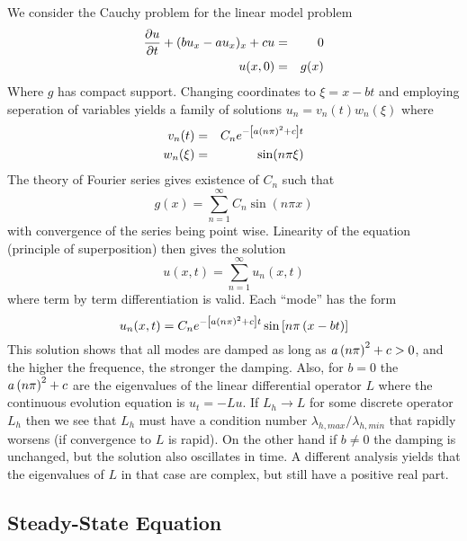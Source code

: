 \documentclass[10pt,dvips,twoside,reqno]{amsart}
\begin{document}
We consider the Cauchy problem for the linear model problem
\begin{eqnarray}
\frac{\partial {u}}{\partial {t}} +(b u_x - a u_x)_x + c u &=& 0 \\
u(x,0) &=& g(x)
\end{eqnarray}
Where $g$ has compact support. Changing coordinates to $\xi = x - bt$
and employing seperation of variables yields a family of solutions
$u_n = v_n(t) w_n(\xi)$ where
\begin{eqnarray}
v_n(t) &=& C_n e^{-\left[ a\left( n \pi \right)^2 + c \right] t} \\
w_n(\xi) &=& \sin(n \pi \xi)
\end{eqnarray}
The theory of Fourier series gives existence of $C_n$ such that
\begin{equation}
g(x) = \sum_{n=1}^{\infty} C_n \sin(n \pi x)
\end{equation}
with convergence of the series being point wise. Linearity of the
equation (principle of superposition) then gives the solution
\begin{equation}
u(x,t) = \sum_{n=1}^{\infty} u_n(x,t)
\end{equation}
where term by term differentiation is valid. Each ``mode'' has the
form
\begin{equation}
u_n(x,t) = C_n e^{-\left[ a\left( n \pi \right)^2 + c \right] t} \sin\left[ n \pi \left( x - bt\right) \right]
\end{equation}
This solution shows that all modes are damped as long as $a\left( n \pi
\right)^2 + c > 0$, and the higher the frequence, the stronger the
damping.  Also, for $b=0$ the $a \left( n \pi \right)^2 + c$ are the
eigenvalues of the linear differential operator $L$ where the
continuous evolution equation is $u_t = -L u$. If $L_h \rightarrow L$
for some discrete operator $L_h$ then we see that $L_h$ must have a
condition number $\lambda_{h,max}/\lambda_ {h,min}$ that rapidly
worsens (if convergence to $L$ is rapid). On the other hand if $b \neq
0$ the damping is unchanged, but the solution also oscillates in time.
A different analysis yields that the eigenvalues of $L$ in that case
are complex, but still have a positive real part.

\subsection{Steady-State Equation}
\end{document}
